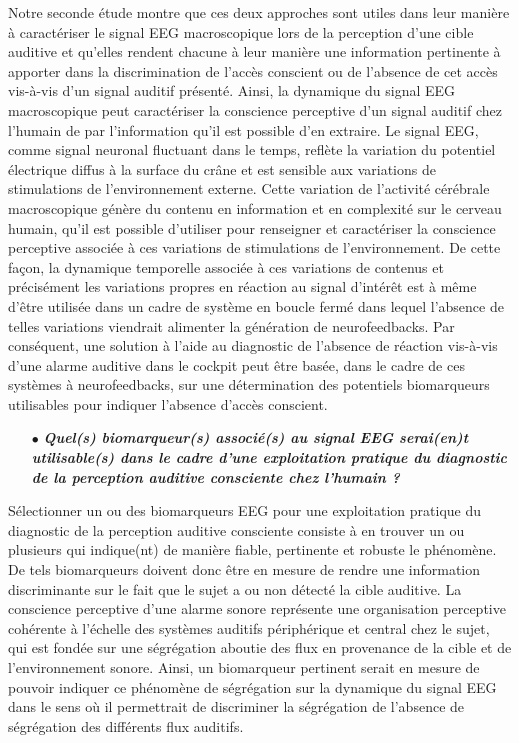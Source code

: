 Notre seconde étude montre que ces deux approches sont utiles dans leur manière à caractériser le signal EEG macroscopique lors de la perception d'une cible auditive et qu'elles rendent chacune à leur manière une information pertinente à apporter dans la discrimination de l'accès conscient ou de l'absence de cet accès vis-à-vis d'un signal auditif présenté. 
Ainsi, la dynamique du signal EEG macroscopique peut caractériser la conscience perceptive d'un signal auditif chez l'humain de par l'information qu'il est possible d'en extraire. 
Le signal EEG, comme signal neuronal fluctuant dans le temps, reflète la variation du potentiel électrique diffus à la surface du crâne et est sensible aux variations de stimulations de l'environnement externe. 
Cette variation de l'activité cérébrale macroscopique génère du contenu en information et en complexité sur le cerveau humain, qu'il est possible d'utiliser pour renseigner et caractériser la conscience perceptive associée à ces variations de stimulations de l'environnement. 
De cette façon, la dynamique temporelle associée à ces variations de contenus et précisément les variations propres en réaction au signal d'intérêt est à même d'être utilisée dans un cadre de système en boucle fermé dans lequel l'absence de telles variations viendrait alimenter la génération de neurofeedbacks. 
Par conséquent, une solution à l'aide au diagnostic de l'absence de réaction vis-à-vis d'une alarme auditive dans le cockpit peut être basée, dans le cadre de ces systèmes à neurofeedbacks, sur une détermination des potentiels biomarqueurs utilisables pour indiquer l'absence d'accès conscient. \\

\begin{itemize}
\item[$\bullet$] \textit{\textbf{Quel(s) biomarqueur(s) associé(s) au signal EEG serai(en)t utilisable(s) dans le cadre d'une exploitation pratique du diagnostic de la perception auditive consciente chez l'humain ?}} \\
\end{itemize}

Sélectionner un ou des biomarqueurs EEG pour une exploitation pratique du diagnostic de la perception auditive consciente consiste à en trouver un ou plusieurs qui indique(nt) de manière fiable, pertinente et robuste le phénomène. 
De tels biomarqueurs doivent donc être en mesure de rendre une information discriminante sur le fait que le sujet a ou non détecté la cible auditive. 
La conscience perceptive d'une alarme sonore représente une organisation perceptive cohérente à l'échelle des systèmes auditifs périphérique et central chez le sujet, qui est fondée sur une ségrégation aboutie des flux en provenance de la cible et de l'environnement sonore. 
Ainsi, un biomarqueur pertinent serait en mesure de pouvoir indiquer ce phénomène de ségrégation sur la dynamique du signal EEG dans le sens où il permettrait de discriminer la ségrégation de l'absence de ségrégation des différents flux auditifs. 

